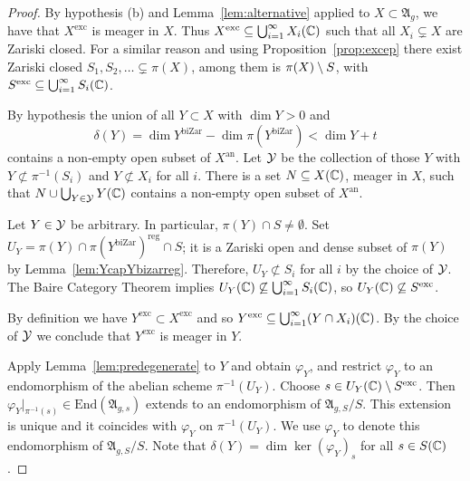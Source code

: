 \documentclass[12pt,oneside]{amsart}
\newcommand{\philipp}[1]{{\color{blue} Philipp: #1}}
\newcommand{\ziyang}[1]{{\color{red} Ziyang: #1}}
\begin{document}
\begin{proof}
  By hypothesis (b) and Lemma~\ref{lem:alternative} applied to
  $X\subset \mathfrak{A}_{g}$, we have that $X^{\mathrm{exc}}$ is meager
  in $X$. Thus $X^{\mathrm{exc}}\subseteq \bigcup_{i=1}^\infty X_i({\mathbb{C}})$
  such that all $X_i\subsetneq X$ are Zariski closed.
  For a similar reason and using Proposition~\ref{prop:excep} there exist
  Zariski closed $S_1,S_2,\ldots\subsetneq \pi(X)$, among them is
  $\pi(X)\setminus S$,  with
  $S^{\mathrm{exc}}\subseteq \bigcup_{i=1}^\infty S_i({\mathbb{C}})$. 
  
  By hypothesis the union of all $Y\subset X$ with $\dim Y > 0$ and
  \begin{equation}
    \label{eq:tequalzeroprop}
    \delta(Y) = \dim Y^{\mathrm{biZar}} - \dim \pi(Y^{\mathrm{biZar}})
    < \dim Y  + t
  \end{equation}
  contains a non-empty open subset of $X^{\mathrm{an}}$. Let 
 ${\mathcal Y}$ be the collection of those  $Y$ with
 $Y\not\subset\pi^{-1}(S_i)$ and  $Y\not\subset X_i$  for all $i$.
  There is a set
  $N\subseteq X({\mathbb{C}})$, meager in  $X$, such that 
  $N\cup \bigcup_{Y\in {\mathcal Y}} Y({\mathbb{C}})$ contains a non-empty open
  subset of $X^{\mathrm{an}}$.

  Let $Y\in {\mathcal Y}$ be arbitrary. In particular, $\pi(Y)\cap S\not=\emptyset$.  Set $U_Y=
  \pi(Y)\cap \pi(Y^{\mathrm{biZar}})^{\mathrm{reg}}\cap S$; it is a Zariski open and dense
  subset of $\pi(Y)$ by Lemma~\ref{lem:YcapYbizarreg}.
  Therefore, $U_Y\not\subset S_i$ for all $i$ by the choice of ${\mathcal Y}$.
  The Baire Category Theorem implies
  $U_Y({\mathbb{C}})\not\subseteq  \bigcup_{i=1}^\infty S_i({\mathbb{C}})$, so
  $U_Y({\mathbb{C}})\not\subseteq S^{\mathrm{exc}}$.%
  
  
  By definition  we have
  $Y^{\mathrm{exc}}\subset X^{\mathrm{exc}}$
  and so $Y^{\mathrm{exc}}\subseteq \bigcup_{i=1}^\infty (Y\cap
  X_i)({\mathbb{C}})$.
  By the choice of ${\mathcal Y}$ we conclude that $Y^{\mathrm{exc}}$ is meager
  in $Y$. 

  Apply
  Lemma~\ref{lem:predegenerate} to $Y$ and obtain $\varphi_Y$, %
  and restrict $\varphi_Y$ to an endomorphism of the abelian
  scheme $\pi^{-1}(U_Y)$. 
%
  Choose $s\in U_Y({\mathbb{C}})\setminus S^{\mathrm{exc}}$. 
  Then ${\varphi_Y}|_{\pi^{-1}(s)} \in \mathrm{End}(\mathfrak{A}_{g,s})$   extends to an
  endomorphism of $\mathfrak{A}_{g,S}/S$. This extension is unique and it
  coincides with $\varphi_Y$ on $\pi^{-1}(U_Y)$. We use $\varphi_Y$ to
  denote this endomorphism of $\mathfrak{A}_{g,S}/S$. Note that $\delta(Y) =
  \dim\ker(\varphi_Y)_s$ for all $s\in S({\mathbb{C}})$.


\end{proof}
\end{document}
